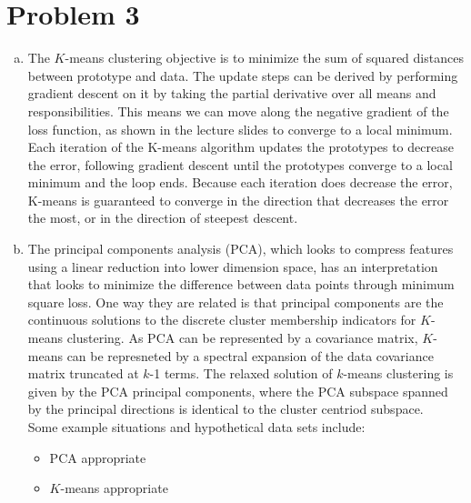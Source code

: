 \documentclass[11pt]{article}
\begin{document}
\section{Problem 3}
\begin{enumerate}[a.]
\item The $K$-means clustering objective is to minimize the sum of squared distances between prototype and data. The update steps can be derived by performing gradient descent on it by taking the partial derivative over all means and responsibilities. This means we can move along the negative gradient of the loss function, as shown in the lecture slides to converge to a local minimum. Each iteration of the K-means algorithm updates the prototypes to decrease the error, following gradient descent until the prototypes converge to a local minimum and the loop ends. Because each iteration does decrease the error, K-means is guaranteed to converge in the direction that decreases the error the most, or in the direction of steepest descent. 
\item The principal components analysis (PCA), which looks to compress features using a linear reduction into lower dimension space, has an interpretation that looks to minimize the difference between data points through minimum square loss. One way they are related is that principal components are the continuous solutions to the discrete cluster membership indicators for $K$-means clustering. As PCA can be represented by a covariance matrix, $K$-means can be represneted by a spectral expansion of the data covariance matrix truncated at $k$-1 terms. The relaxed solution of $k$-means clustering is given by the PCA principal components, where the PCA subspace spanned by the principal directions is identical to the cluster centriod subspace.\\
Some example situations and hypothetical data sets include:
	\begin{itemize}
	\item PCA appropriate
	\item $K$-means appropriate
	\end{itemize}
\end{enumerate}
\end{document}
